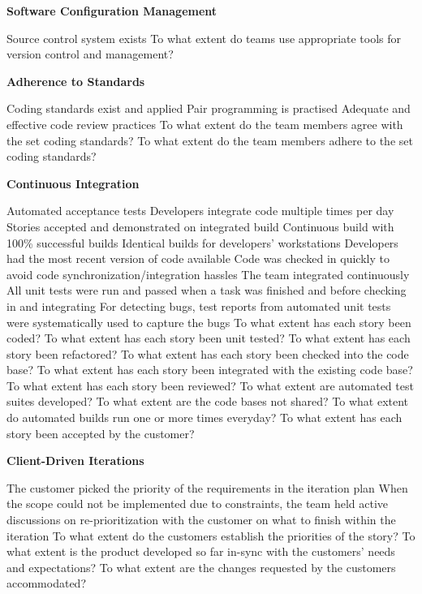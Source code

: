\textbf{Software Configuration Management}
\begin{itemize}
	\taa Source control system exists
	\ops To what extent do teams use appropriate tools for version control and management?
\end{itemize}

\textbf{Adherence to Standards} %
\begin{itemize}
	\taa Coding standards exist and applied
	\taa Pair programming is practised %
	\taa Adequate and effective code review practices
	\ops To what extent do the team members agree with the set coding standards? 
	\ops To what extent do the team members adhere to the set coding standards?
\end{itemize}

\textbf{Continuous Integration}
\begin{itemize}
	\taa Automated acceptance tests
	\taar Developers integrate code multiple times per day
	\taar Stories accepted and demonstrated on integrated build
	\taar Continuous build with 100\% successful builds
	\taar Identical builds for developers' workstations %
	\pam Developers had the most recent version of code available
	\pam Code was checked in quickly to avoid code synchronization/integration hassles
	\pamr The team integrated continuously
	\pamr All unit tests were run and passed when a task was finished and before checking in and integrating
	\pamr For detecting bugs, test reports from automated unit tests were systematically used to capture the bugs
	\ops To what extent has each story been coded? 
	\ops To what extent has each story been unit tested? 
	\ops To what extent has each story been refactored? 
	\ops To what extent has each story been checked into the code base? 
	\ops To what extent has each story been integrated with the existing code base? 
	\ops To what extent has each story been reviewed?
	\ops To what extent are automated test suites developed? 
	\ops To what extent are the code bases not shared? 
	\ops To what extent do automated builds run one or more times everyday?
	\ops To what extent has each story been accepted by the customer? %
\end{itemize}

\textbf{Client-Driven Iterations}
\begin{itemize}
	\pam The customer picked the priority of the requirements in the iteration plan
	\pamr When the scope could not be implemented due to constraints, the team held active discussions on re-prioritization with the customer on what to finish within the iteration 
	\ops To what extent do the customers establish the priorities of the story?
	\ops To what extent is the product developed so far in-sync with the customers' needs and expectations?
	\ops To what extent are the changes requested by the customers accommodated?
\end{itemize}

